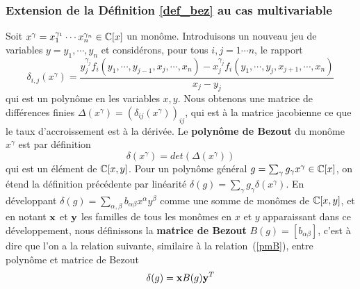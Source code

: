 \documentclass{standalone}
\begin{document}
\subsubsection{Extension de la Définition \ref{def_bez} au cas multivariable}


\begin{defn}
Soit $x^\gamma = x_1^{\gamma_1}\cdots x_n^{\gamma_n} \in \mathbb{C}[x]$ un monôme.
Introduisons un nouveau jeu de variables $y = y_1,\cdots, y_n$ et considérons, pour tous $i, j = 1\cdots n$, le rapport
\begin{equation}
\label{finite_diff}
\delta_{i,j}(x^\gamma) = \dfrac{y_j^{\gamma_j}f_i(y_1,\cdots, y_{j-1},x_j,\cdots,x_n) - x_j^{\gamma_j}f_i(y_1,\cdots,y_j,x_{j+1},\cdots,x_n)}{x_j - y_j}
\end{equation}
qui est un polynôme en les variables $x, y$. Nous obtenons une matrice de différences finies $\Delta(x^\gamma) = (\delta_{ij}(x^\gamma))_{ij}$, qui est à la matrice jacobienne ce que le taux d'accroissement est à la dérivée.
Le {\bf polynôme de Bezout} du monôme $x^\gamma$ est par définition
\begin{equation}
	\delta(x^\gamma) = det(\Delta(x^\gamma))
\end{equation}
qui est un élément de $\mathbb{C}[x, y]$. Pour un polynôme général $g = \sum_\gamma g_\gamma x^\gamma \in \mathbb{C}[x]$, on étend la définition précédente par linéarité $\delta(g) = \sum_\gamma g_\gamma \delta(x^\gamma)$.
En développant $\delta(g) = \sum_{\alpha,\beta} b_{\alpha\beta} x^\alpha y^\beta$ comme une somme de monômes de $\mathbb{C}[x, y]$, et en notant $\bold{x}$ et $\bold{y}$ les familles de tous les monômes en $x$ et $y$ apparaissant dans ce développement, nous définissons la {\bf matrice de Bezout} $B(g) = [b_{\alpha\beta}]$, c'est à dire que l'on a la relation suivante, similaire à la relation~(\ref{pmB}), entre polynôme et matrice de Bezout
\begin{equation}
	\delta(g) = \bold{x} B(g) \bold{y}^T
\end{equation}
\end{defn}
\end{document}
